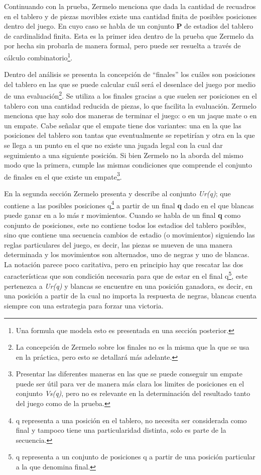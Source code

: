 \documentclass[twoside,openright,12pt,a4paper,spanish]{book}
\begin{document}
Continuando con la prueba, Zermelo menciona que dada la cantidad de recuadros en el tablero y de piezas movibles existe una cantidad finita de posibles posiciones dentro del juego. En cuyo caso se habla de un conjunto \textbf{P} de estadios del tablero de cardinalidad finita. Esta es la primer idea dentro de la prueba que Zermelo da por hecha sin probarla de manera formal, pero puede ser resuelta a través de cálculo combinatorio\footnote{Una formula que modela esto es presentada en una sección posterior.}.

Dentro del análisis se presenta la concepción de “finales” los cuáles son posiciones del tablero en las que se puede calcular cuál será el desenlace del juego por medio de una evaluación\footnote{La concepción de Zermelo sobre los finales no es la misma que la que se usa en la práctica, pero esto se detallará más adelante.}. Se utiliza a los finales gracias a que suelen ser posiciones en el tablero con una cantidad reducida de piezas, lo que facilita la evaluación. Zermelo menciona que hay solo dos maneras de terminar el juego: o en un jaque mate o en un empate. Cabe señalar que el empate tiene dos variantes: una en la que las posiciones del tablero son tantas que eventualmente se repetirían y otra en la que se llega a un punto en el que no existe una jugada legal con la cual dar seguimiento a una siguiente posición. Si bien Zermelo no la aborda del mismo modo que la primera, cumple las mismas condiciones que comprende el conjunto de finales en el que existe un empate\footnote{Presentar las diferentes maneras en las que se puede conseguir un empate puede ser útil para ver de manera más clara los limites de posiciones en el conjunto \emph{Vs(q)}, pero no es relevante en la determinación del resultado tanto del juego como de la prueba.}. 

En la segunda sección Zermelo presenta y describe al conjunto \emph{Ur(q)}; que contiene a las posibles posiciones q\footnote{q representa a una posición en el tablero, no necesita ser considerada como final y tampoco tiene una particularidad distinta, solo es parte de la secuencia.} a partir de un final \textbf{q} dado en el que blancas puede ganar en a lo más r movimientos. Cuando se habla de un final \textbf{q} como conjunto de posiciones, este no contiene todos los estadios del tablero posibles, sino que contiene una secuencia cambios de estadio (o movimientos) siguiendo las reglas particulares del juego, es decir, las piezas se mueven de una manera determinada y los movimientos son alternados, uno de negras y uno de blancas. La notación parece poco caritativa, pero en principio hay que rescatar las dos características que son condición necesaria para que de estar en el final q\footnote{q representa a un conjunto de posiciones q a partir de una posición particular a la que denomina final.}, este pertenezca a \emph{Ur(q)} y blancas se encuentre en una posición ganadora, es decir, en una posición a partir de la cual no importa la respuesta de negras, blancas cuenta siempre con una estrategia para forzar una victoria.
\end{document}
